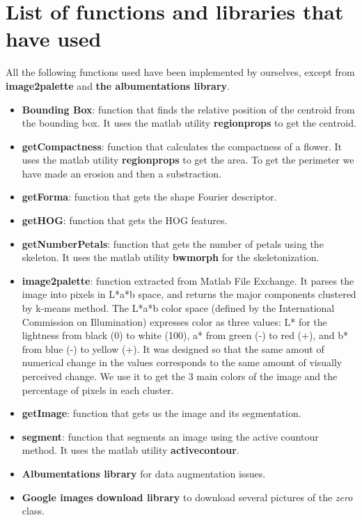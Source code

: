 \documentclass[11]{article}
\begin{document}
\section{List of functions and libraries that have used}

All the following functions used have been implemented by ourselves, except from \textbf{image2palette} and \textbf{the albumentations library}.

\begin{itemize}
\item \textbf{Bounding Box}: function that finds the relative position of the centroid from the bounding box. It uses the matlab utility \textbf{regionprops} to get the centroid.
\item \textbf{getCompactness}: function that calculates the compactness of a flower. It uses the matlab utility \textbf{regionprops} to get the area. To get the perimeter we have made an erosion and then a substraction. 
\item \textbf{getForma}: function that gets the shape Fourier descriptor. 
\item \textbf{getHOG}: function that gets the HOG features.
\item \textbf{getNumberPetals}: function that gets the number of petals using the skeleton. It uses the matlab utility \textbf{bwmorph} for the skeletonization. 
\item \textbf{image2palette}\cite{image2palette}: function extracted from Matlab File Exchange. It parses the image into pixels in L*a*b space, and returns the major components clustered by k-means method. The L*a*b color space (defined by the International Commission on Illumination) expresses color as three values: L* for the lightness from black (0) to white (100), a* from green (-) to red (+), and b* from blue (-) to yellow (+). It was designed so that the same amout of numerical change in the values corresponds to the same amount of visually perceived change. We use it to get the 3 main colors of the image and the percentage of pixels in each cluster.
\item \textbf{getImage}: function that gets us the image and its segmentation.
\item \textbf{segment}: function that segments an image using the active countour method. It uses the matlab utility \textbf{activecontour}.

\item \textbf{Albumentations library}\cite{Albumentations} for data augmentation issues.
\item \textbf{Google images download library}\cite{Google images download} to download several pictures of the \textit{zero} class.
\end{itemize}
\end{document}
